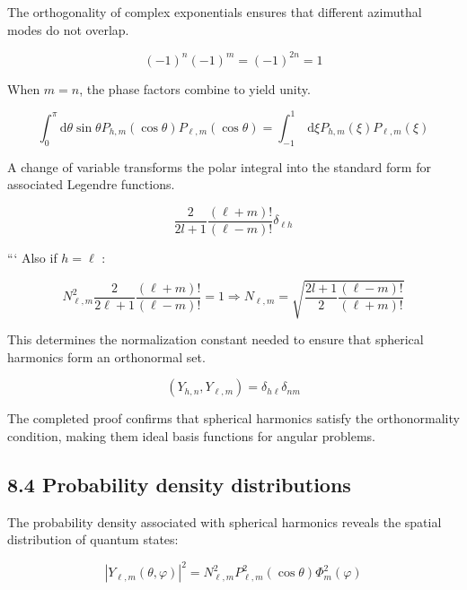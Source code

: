 \documentclass[10pt]{article}
\begin{document}
The orthogonality of complex exponentials ensures that different azimuthal modes do not overlap.

\begin{equation*}
(-1)^{n}(-1)^{m}=(-1)^{2 n}=1 \tag{8.54}
\end{equation*}

When $m=n$, the phase factors combine to yield unity.

\begin{equation*}
\int_{0}^{\pi} \mathrm{d} \theta \sin \theta P_{h, m}(\cos \theta) P_{\ell, m}(\cos \theta)=\int_{-1}^{1} \mathrm{~d} \xi P_{h, m}(\xi) P_{\ell, m}(\xi) \tag{8.55}
\end{equation*}

A change of variable transforms the polar integral into the standard form for associated Legendre functions.

\begin{equation*}
\frac{2}{2 l+1} \frac{(\ell+m)!}{(\ell-m)!} \delta_{\ell h} \tag{8.56}
\end{equation*}

```
Also if $h=\ell$ :

\begin{equation*}
N_{\ell, m}^{2} \frac{2}{2 \ell+1} \frac{(\ell+m)!}{(\ell-m)!}=1 \Longrightarrow N_{\ell, m}=\sqrt{\frac{2 l+1}{2} \frac{(\ell-m)!}{(\ell+m)!}} \tag{8.57}
\end{equation*}

This determines the normalization constant needed to ensure that spherical harmonics form an orthonormal set.

\begin{equation*}
\left(Y_{h, n}, Y_{\ell, m}\right)=\delta_{h \ell} \delta_{n m} \tag{8.58}
\end{equation*}

The completed proof confirms that spherical harmonics satisfy the orthonormality condition, making them ideal basis functions for angular problems.

\subsection*{8.4 Probability density distributions}
The probability density associated with spherical harmonics reveals the spatial distribution of quantum states:

\begin{equation*}
\left|Y_{\ell, m}(\theta, \varphi)\right|^{2}=N_{\ell, m}^{2} P_{\ell, m}^{2}(\cos \theta) \Phi_{m}^{2}(\varphi) \tag{8.59}
\end{equation*}
\end{document}
